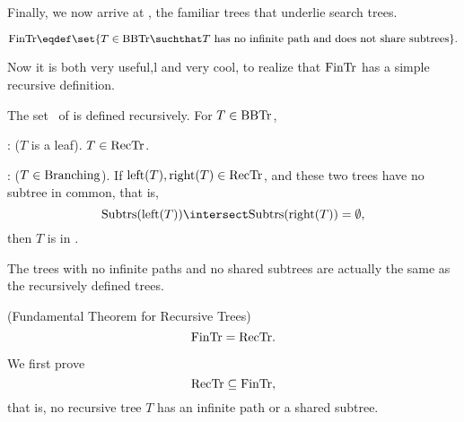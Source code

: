 Finally, we now arrive at \fintr, the familiar trees that underlie
search trees.
\begin{definition}
\[
\fintr \eqdef \set{T \in \brnch \suchthat T\ \text{has no infinite path and
  does not share subtrees}}.
\]
\end{definition}

Now it is both very useful,l and very cool, to realize that $\text{FinTr}$
has a simple recursive definition.

\begin{definition}
The set \rectr\ of  is defined recursively.  For
$T \in \text{BBTr}$,

: ($T$ is a leaf).  $T \in \text{RecTr}$.

: ($T \in \text{Branching}$).
If $\text{left}(T), \text{right}(T) \in \text{RecTr}$, and these two trees
have no subtree in common, that is,
\[
\subbrn{\leftsub{(T)}} \intersect \subbrn{\rightsub{(T)}} = \emptyset,
\]
then $T$ is in \rectr.
\end{definition}

The trees with no infinite paths and no shared subtrees are actually
the same as the recursively defined trees.

\begin{theorem}\label{fundthmrec}(Fundamental Theorem for Recursive Trees)
\[
\text{FinTr} = \text{RecTr}.
\]
\end{theorem}

We first prove
\begin{equation}\label{rectrsubfintr}
\text{RecTr} \subseteq \text{FinTr},
\end{equation}
that is, no recursive tree $T$ has an infinite path or a shared subtree.

